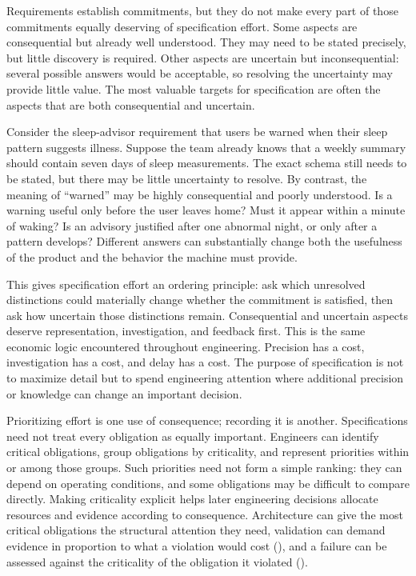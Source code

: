 Requirements establish commitments, but they do not make every part of those commitments equally
deserving of specification effort. Some aspects are consequential but already well understood. They
may need to be stated precisely, but little discovery is required. Other aspects are uncertain but
inconsequential: several possible answers would be acceptable, so resolving the uncertainty may
provide little value. The most valuable targets for specification are often the aspects that are
both consequential and uncertain.

Consider the sleep-advisor requirement that users be warned when their sleep pattern suggests
illness. Suppose the team already knows that a weekly summary should contain seven days of sleep
measurements. The exact schema still needs to be stated, but there may be little uncertainty to
resolve. By contrast, the meaning of ``warned'' may be highly consequential and poorly understood. Is
a warning useful only before the user leaves home? Must it appear within a minute of waking? Is an
advisory justified after one abnormal night, or only after a pattern develops? Different answers
can substantially change both the usefulness of the product and the behavior the machine must
provide.

This gives specification effort an ordering principle: ask which unresolved distinctions could
materially change whether the commitment is satisfied, then ask how uncertain those distinctions
remain. Consequential and uncertain aspects deserve representation, investigation, and feedback
first. This is the same economic logic encountered throughout engineering. Precision has a cost,
investigation has a cost, and delay has a cost. The purpose of specification is not to maximize
detail but to spend engineering attention where additional precision or knowledge can change an
important decision.

Prioritizing effort is one use of consequence; recording it is another. Specifications need not
treat every obligation as equally important. Engineers can identify critical obligations, group
obligations by criticality, and represent priorities within or among those groups. Such priorities
need not form a simple ranking: they can depend on operating conditions, and some obligations may
be difficult to compare directly. Making criticality explicit helps later engineering decisions
allocate resources and evidence according to consequence. Architecture can give the most critical
obligations the structural attention they need, validation can demand evidence in proportion to
what a violation would cost (\citet{sec-consequence-evidence}), and a failure can be assessed against the
criticality of the obligation it violated (\citet{ch-failure-aware-engineering}).

